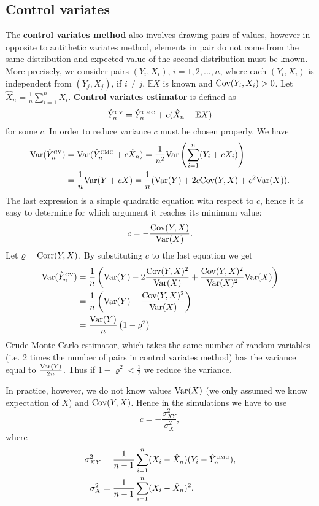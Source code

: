 \documentclass[a4paper,12pt, oneside]{book}
\theoremstyle{definition}
\theoremstyle{remark}
\def\Var{{\rm Var}}
\def\E{{\mathbb{E}}}
\def\Cov{{\hbox{Cov}}}
\def\Corr{{\hbox{Corr}}}
\def\CMC[#1]{\hat{Y}^{\hbox{\tiny CMC}}_{#1}}
\def\CV[#1]{\hat{Y}^{\hbox{\tiny CV}}_{#1}}
\begin{document}
\subsection{Control variates}
The \textbf{control variates method} also involves drawing pairs of values, however in opposite to antithetic variates method, elements in pair do not come from the same distribution and expected value of the second distribution must be known. More precisely, we consider pairs $(Y_i, X_i)$, $i=1,2,...,n$, where each $(Y_i, X_i)$ is independent from $(Y_j, X_j)$,
if $i \neq j$, $\E X$ is known and $\Cov(Y_i, X_i) > 0$. Let $\hat{X}_n = \frac{1}{n}\sum_{i=1}^n X_i$. \textbf{Control variates estimator} is defined as
\begin{equation}
 \label{eq:CV}
 \CV[n] = \CMC[n] + c(\hat{X}_n - \E X)
\end{equation}
for some $c$. In order to reduce variance $c$ must be chosen properly. We have
\begin{equation*}
 \begin{split}
 \Var( \CV[n] ) &= \Var( \CMC[n] + c\hat{X}_n ) = \frac{1}{n^2} \Var \left( \sum\limits_{i=1}^n( Y_i + c X_i) \right) \\
                &= \frac{1}{n}\Var(Y + c X) = \frac{1}{n}( \Var(Y) + 2c\Cov(Y,X) + c^2 \Var(X)).
 \end{split}
\end{equation*}
The last expression is a simple quadratic equation with respect to $c$, hence it is easy to determine for which argument it reaches its minimum value:
\[ c = -\frac{\Cov(Y,X)}{\Var(X)}. \]
Let $\varrho = \Corr(Y,X)$. By substituting $c$ to the last equation we get
\begin{equation}
 \begin{split}
 \Var( \CV[n] ) &=  \frac{1}{n} \left( \Var(Y) - 2\frac{\Cov(Y,X)^2}{\Var(X)} + \frac{\Cov(Y,X)^2}{\Var(X)^2} \Var(X) \right) \\
 &= \frac{1}{n} \left( \Var(Y) - \frac{\Cov(Y,X)^2}{\Var(X)}  \right) \\
 &= \frac{\Var(Y)}{n} \left( 1 - \varrho^2  \right) \label{eq:VarCV}
 \end{split}
\end{equation}
Crude Monte Carlo estimator, which takes the same number of random variables (i.e. 2 times the number of pairs in control variates method) has the variance equal to $\frac{\Var(Y)}{2n}$. Thus if $1 - \varrho^2 < \frac{1}{2}$ we reduce the variance.

In practice, however, we do not know values $\Var(X)$ (we only assumed we know expectation of $X$) and $\Cov(Y,X)$. Hence in the simulations we have to use 
\begin{equation}
 \label{eq:CVc}
 c = -\frac{\sigma_{XY}^2}{\sigma_{X}^2},
\end{equation}
where
\begin{equation*}
 \begin{split}
  \sigma_{XY}^2 &= \frac{1}{n-1} \sum\limits_{i=1}^{n} (X_i - \hat{X}_n)(Y_i - \CMC[n]),\\
  \sigma_{X}^2 &= \frac{1}{n-1} \sum\limits_{i=1}^{n} (X_i - \hat{X}_n)^2.
 \end{split}
\end{equation*}
\end{document}
